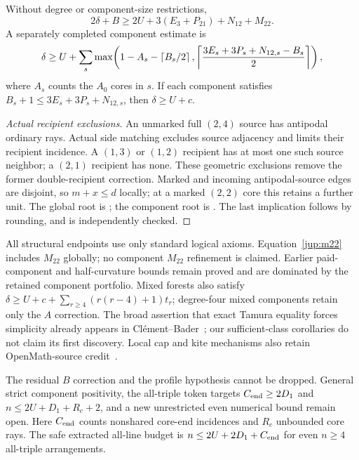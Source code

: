 \begin{theorem}\label{jup:triple}
Without degree or component-size restrictions,
\begin{equation}\label{jup:m22}
 2\delta+B\ge2U+3(E_3+P_{21})+N_{12}+M_{22}.
\end{equation}
A separately completed component estimate is
\begin{equation}\label{jup:hybrid}
 \delta\ge U+\sum_s\max\!\left(
 1-A_s-\left\lceil B_s/2\right\rceil,
 \left\lceil\frac{3E_s+3P_s+N_{12,s}-B_s}{2}\right\rceil\right),
\end{equation}
where $A_s$ counts the $A_0$ cores in $s$. If each component satisfies
$B_s+1\le3E_s+3P_s+N_{12,s}$, then $\delta\ge U+c$.
\end{theorem}
\begin{proof}[Actual recipient exclusions]
An unmarked full $(2,4)$ source has antipodal ordinary rays. Actual side matching excludes source adjacency and limits their recipient incidence. A $(1,3)$ or $(1,2)$ recipient has at most one such source neighbor; a $(2,1)$ recipient has none. These geometric exclusions remove the former double-recipient correction. Marked and incoming antipodal-source edges are disjoint, so $m+x\le d$ locally; at a marked $(2,2)$ core this retains a further unit. The global root is
;
the component root is
.
The last implication follows by rounding, and is independently checked.
\end{proof}
All structural endpoints use only standard logical axioms. Equation~\eqref{jup:m22} includes $M_{22}$ globally; no component $M_{22}$ refinement is claimed. Earlier paid-component and half-curvature bounds remain proved and are dominated by the retained component portfolio. Mixed forests also satisfy $\delta\ge U+c+\sum_{r\ge4}(r(r-4)+1)t_r$; degree-four mixed components retain only the $A$ correction. The broad assertion that exact Tamura equality forces simplicity already appears in Cl\'ement--Bader~\cite{clementbader2007}; our sufficient-class corollaries do not claim its first discovery. Local cap and kite mechanisms also retain OpenMath-source credit~\cite{srirangam2026}.

The residual $B$ correction and the profile hypothesis cannot be dropped. General strict component positivity, the all-triple token targets $C_{\rm end}\ge2D_1$ and $n\le2U+D_1+R_c+2$, and a new unrestricted even numerical bound remain open. Here $C_{\rm end}$ counts nonshared core-end incidences and $R_c$ unbounded core rays. The safe extracted all-line budget is $n\le2U+2D_1+C_{\rm end}$ for even $n\ge4$ all-triple arrangements.

